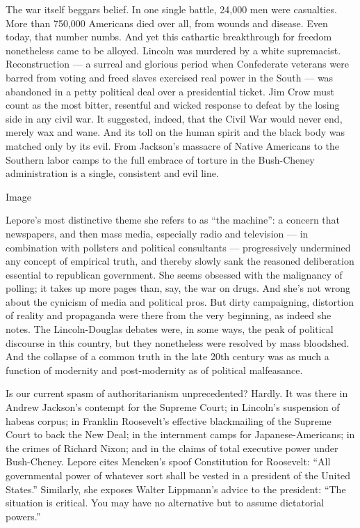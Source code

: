 The war itself beggars belief. In one single battle, 24,000 men were
casualties. More than 750,000 Americans died over all, from wounds and
disease. Even today, that number numbs. And yet this cathartic
breakthrough for freedom nonetheless came to be alloyed. Lincoln was
murdered by a white supremacist. Reconstruction --- a surreal and
glorious period when Confederate veterans were barred from voting and
freed slaves exercised real power in the South --- was abandoned in a
petty political deal over a presidential ticket. Jim Crow must count as
the most bitter, resentful and wicked response to defeat by the losing
side in any civil war. It suggested, indeed, that the Civil War would
never end, merely wax and wane. And its toll on the human spirit and the
black body was matched only by its evil. From Jackson's massacre of
Native Americans to the Southern labor camps to the full embrace of
torture in the Bush-Cheney administration is a single, consistent and
evil line.

Image

Lepore's most distinctive theme she refers to as ``the machine'': a
concern that newspapers, and then mass media, especially radio and
television --- in combination with pollsters and political consultants
--- progressively undermined any concept of empirical truth, and thereby
slowly sank the reasoned deliberation essential to republican
government. She seems obsessed with the malignancy of polling; it takes
up more pages than, say, the war on drugs. And she's not wrong about the
cynicism of media and political pros. But dirty campaigning, distortion
of reality and propaganda were there from the very beginning, as indeed
she notes. The Lincoln-Douglas debates were, in some ways, the peak of
political discourse in this country, but they nonetheless were resolved
by mass bloodshed. And the collapse of a common truth in the late 20th
century was as much a function of modernity and post-modernity as of
political malfeasance.

Is our current spasm of authoritarianism unprecedented? Hardly. It was
there in Andrew Jackson's contempt for the Supreme Court; in Lincoln's
suspension of habeas corpus; in Franklin Roosevelt's effective
blackmailing of the Supreme Court to back the New Deal; in the
internment camps for Japanese-Americans; in the crimes of Richard Nixon;
and in the claims of total executive power under Bush-Cheney. Lepore
cites Mencken's spoof Constitution for Roosevelt: ``All governmental
power of whatever sort shall be vested in a president of the United
States.'' Similarly, she exposes Walter Lippmann's advice to the
president: ``The situation is critical. You may have no alternative but
to assume dictatorial powers.''

